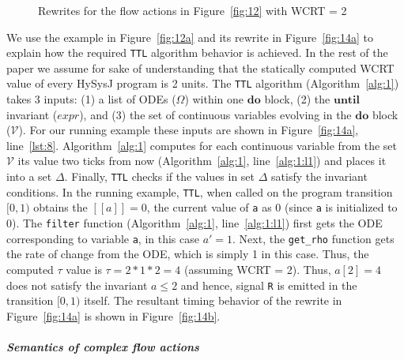 \documentclass[10pt,journal,cspaper,compsoc]{IEEEtran}
\begin{document}
\begin{figure}[t!]
  \ContinuedFloat
  \centering
  \hspace{20pt}
  \caption{Rewrites for the flow actions in Figure~\ref{fig:12}
    with WCRT = 2}
  \label{fig:14}
\end{figure}



We use the example in Figure~\ref{fig:12a} and its rewrite in
Figure~\ref{fig:14a} to explain how the required \texttt{TTL} algorithm
behavior is achieved. In the rest of the paper we assume for sake of
understanding that the statically computed WCRT value of every HySysJ
program is 2 units. The \texttt{TTL} algorithm (Algorithm~\ref{alg:1})
takes 3 inputs: (1) a list of ODEs ($\Omega$) within one $\mathbf{do}$
block, (2) the $\mathbf{until}$ invariant ($expr$), and (3) the set of
continuous variables evolving in the $\mathbf{do}$ block
($\mathcal{V}$). For our running example these inputs are shown in
Figure~\ref{fig:14a}, line~\ref{lst:8}. Algorithm~\ref{alg:1} computes
for each continuous variable from the set $\mathcal{V}$ its value two
ticks from now (Algorithm~\ref{alg:1}, line~\ref{alg:1:l1}) and places
it into a set $\Delta$. Finally, \texttt{TTL} checks if the values in
set $\Delta$ satisfy the invariant conditions. In the running example,
\texttt{TTL}, when called on the program transition $[0,1)$ obtains the
$[\![a]\!]=0$, the current value of \texttt{a} as 0 (since \texttt{a} is
initialized to 0). The \texttt{filter} function (Algorithm~\ref{alg:1},
line~\ref{alg:1:l1}) first gets the ODE corresponding to variable
\texttt{a}, in this case $a' = 1$. Next, the \texttt{get\_rho} function
gets the rate of change from the ODE, which is simply 1 in this
case. Thus, the computed $\tau$ value is $\tau = 2 * 1 * 2 = 4$
(assuming WCRT = 2). Thus, $a[2]=4$ does not satisfy the invariant
$a\leq 2$ and hence, signal \texttt{R} is emitted in the transition
$[0,1)$ itself. The resultant timing behavior of the rewrite in
Figure~\ref{fig:14a} is shown in Figure~\ref{fig:14b}.











\paragraph{\textit{Semantics of complex flow actions}}
\label{sec:semant-compl-flow}
\end{document}
